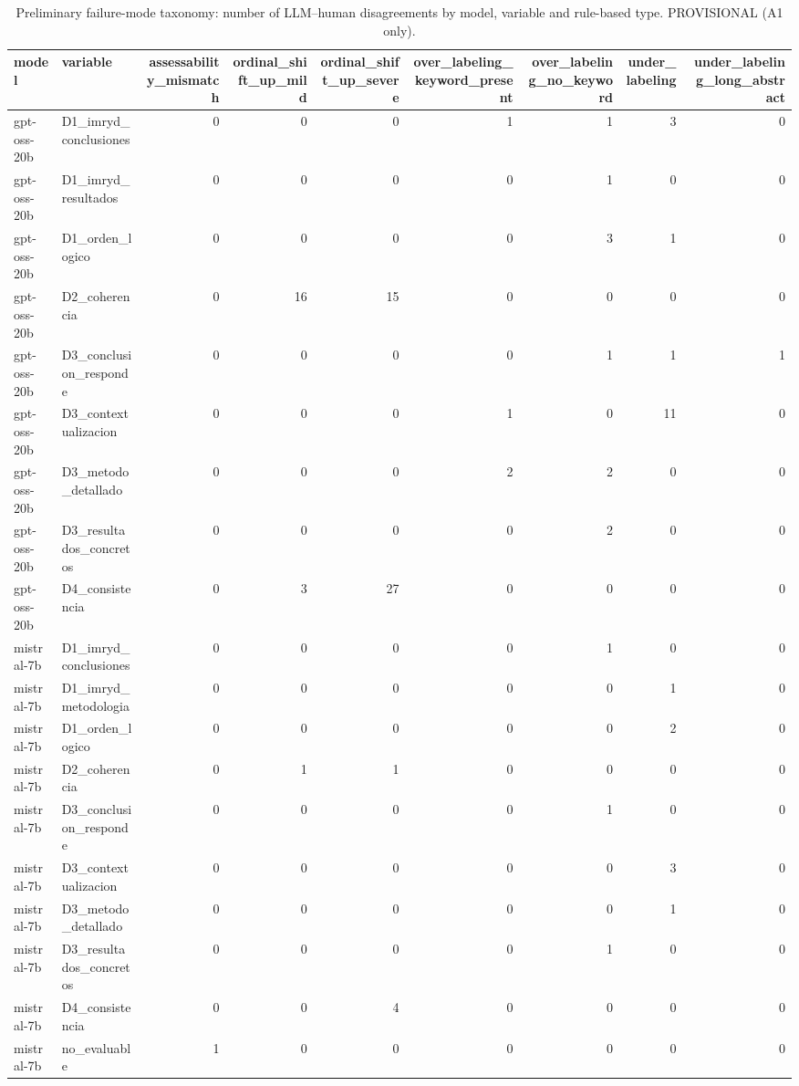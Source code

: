 \begin{table}
\caption{Preliminary failure-mode taxonomy: number of LLM–human disagreements by model, variable and rule-based type. PROVISIONAL (A1 only).}
\label{tab:error-taxonomy}
\begin{tabular}{llrrrrrrr}
\toprule
model & variable & assessability\_mismatch & ordinal\_shift\_up\_mild & ordinal\_shift\_up\_severe & over\_labeling\_keyword\_present & over\_labeling\_no\_keyword & under\_labeling & under\_labeling\_long\_abstract \\
\midrule
gpt-oss-20b & D1\_imryd\_conclusiones & 0 & 0 & 0 & 1 & 1 & 3 & 0 \\
gpt-oss-20b & D1\_imryd\_resultados & 0 & 0 & 0 & 0 & 1 & 0 & 0 \\
gpt-oss-20b & D1\_orden\_logico & 0 & 0 & 0 & 0 & 3 & 1 & 0 \\
gpt-oss-20b & D2\_coherencia & 0 & 16 & 15 & 0 & 0 & 0 & 0 \\
gpt-oss-20b & D3\_conclusion\_responde & 0 & 0 & 0 & 0 & 1 & 1 & 1 \\
gpt-oss-20b & D3\_contextualizacion & 0 & 0 & 0 & 1 & 0 & 11 & 0 \\
gpt-oss-20b & D3\_metodo\_detallado & 0 & 0 & 0 & 2 & 2 & 0 & 0 \\
gpt-oss-20b & D3\_resultados\_concretos & 0 & 0 & 0 & 0 & 2 & 0 & 0 \\
gpt-oss-20b & D4\_consistencia & 0 & 3 & 27 & 0 & 0 & 0 & 0 \\
mistral-7b & D1\_imryd\_conclusiones & 0 & 0 & 0 & 0 & 1 & 0 & 0 \\
mistral-7b & D1\_imryd\_metodologia & 0 & 0 & 0 & 0 & 0 & 1 & 0 \\
mistral-7b & D1\_orden\_logico & 0 & 0 & 0 & 0 & 0 & 2 & 0 \\
mistral-7b & D2\_coherencia & 0 & 1 & 1 & 0 & 0 & 0 & 0 \\
mistral-7b & D3\_conclusion\_responde & 0 & 0 & 0 & 0 & 1 & 0 & 0 \\
mistral-7b & D3\_contextualizacion & 0 & 0 & 0 & 0 & 0 & 3 & 0 \\
mistral-7b & D3\_metodo\_detallado & 0 & 0 & 0 & 0 & 0 & 1 & 0 \\
mistral-7b & D3\_resultados\_concretos & 0 & 0 & 0 & 0 & 1 & 0 & 0 \\
mistral-7b & D4\_consistencia & 0 & 0 & 4 & 0 & 0 & 0 & 0 \\
mistral-7b & no\_evaluable & 1 & 0 & 0 & 0 & 0 & 0 & 0 \\
\bottomrule
\end{tabular}
\end{table}
